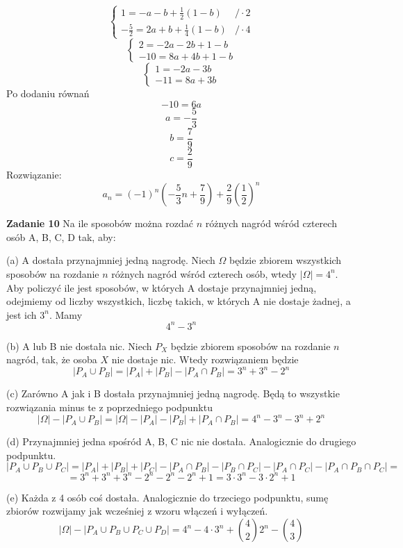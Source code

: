 \documentclass[12pt,a4paper]{article}
\begin{document}
\[
	\left\{ 
	\begin{array}{lll}
		1 = -a - b + \frac{1}{2}(1 - b) & /\cdot2 \\
		-\frac{5}{2} = 2a + b + \frac{1}{4}(1 - b) & /\cdot4
	\end{array} 
	\right.
\]
\[
	\left\{ 
	\begin{array}{lll}
		2 = -2a - 2b + 1 - b \\
		-10 = 8a + 4b + 1 - b
	\end{array} 
	\right.
\]
\[
	\left\{ 
	\begin{array}{lll}
		1 = -2a - 3b \\
		-11 = 8a + 3b
	\end{array} 
	\right.
\]
Po dodaniu równań
\[
	-10 = 6a
\]
\[
	a = -\frac{5}{3}
\]
\[
	b = \frac{7}{9}
\]
\[
	c = \frac{2}{9}
\]
Rozwiązanie: 
\[
	a_n = (-1)^n\left(-\frac{5}{3}n + \frac{7}{9}\right) + \frac{2}{9}\left(\frac{1}{2}\right)^n
\]

\vskip 0.4cm
\noindent
\textbf{Zadanie 10} Na ile sposobów można rozdać \(n\) różnych nagród wśród czterech osób A, B, C, D tak, aby:

(a) A dostała przynajmniej jedną nagrodę. Niech \( \Omega \) będzie zbiorem wszystkich sposobów na rozdanie \( n \) różnych nagród wśród czterech osób, wtedy \( \left\lvert \Omega \right\rvert
= 4^n \). Aby policzyć ile jest sposobów, w których A dostaje przynajmniej jedną, odejmiemy od liczby wszystkich, liczbę takich, w których A nie dostaje żadnej, a jest ich \( 3^n \). Mamy
\[
	4^n - 3^n
\]

(b) A lub B nie dostała nic. Niech \( P_X \) będzie zbiorem sposobów na rozdanie \(n\) nagród, tak, że osoba \(X\) nie dostaje nic. Wtedy rozwiązaniem będzie
\[
	\left\lvert P_A \cup P_B \right\rvert = \left\lvert P_A \right\rvert + \left\lvert P_B \right\rvert - \left\lvert P_A \cap P_B \right\rvert = 3^n + 3^n - 2^n
\]

(c) Zarówno A jak i B dostała przynajmniej jedną nagrodę. Będą to wszystkie rozwiązania minus te z poprzedniego podpunktu
\[
	\left\lvert \Omega \right\rvert - \left\lvert P_A \cup P_B \right\rvert 
	= \left\lvert \Omega \right\rvert - \left\lvert P_A \right\rvert - \left\lvert P_B \right\rvert + \left\lvert P_A \cap P_B \right\rvert 
	= 4^n - 3^n - 3^n + 2^n
\]

(d) Przynajmniej jedna spośród A, B, C nic nie dostała. Analogicznie do drugiego podpunktu.
\[
	\left\lvert P_A \cup P_B \cup P_C \right\rvert 
	= \left\lvert P_A \right\rvert 
	+ \left\lvert P_B \right\rvert
	+ \left\lvert P_C \right\rvert  
	- \left\lvert P_A \cap P_B \right\rvert
	- \left\lvert P_B \cap P_C \right\rvert 
	- \left\lvert P_A \cap P_C \right\rvert
	- \left\lvert P_A \cap P_B \cap P_C \right\rvert =
\]
\[
	= 3^n + 3^n + 3^n - 2^n - 2^n - 2^n + 1 = 3 \cdot 3^n - 3 \cdot 2^n + 1
\]

(e) Każda z 4 osób coś dostała. Analogicznie do trzeciego podpunktu, sumę zbiorów rozwijamy jak wcześniej z wzoru włączeń i wyłączeń.
\[
	\left\lvert \Omega \right\rvert - \left\lvert P_A \cup P_B \cup P_C \cup P_D \right\rvert 
	= 4^n - 4 \cdot 3^n + \binom{4}{2}2^n - \binom{4}{3}
\]
\end{document}
